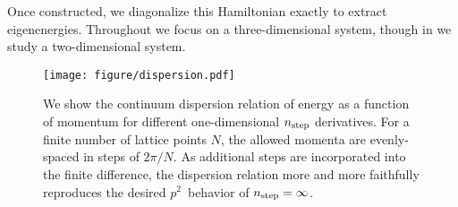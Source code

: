 Once constructed, we diagonalize this Hamiltonian exactly to extract eigenenergies.
Throughout we focus on a three-dimensional system, though in  we study a two-dimensional system.

\begin{figure}
    \texttt{[image: figure/dispersion.pdf]}
    \caption{We show the continuum dispersion relation of energy as a function of momentum for different one-dimensional ${n_\text{step}}$ derivatives.  For a finite number of lattice points $N$, the allowed momenta are evenly-spaced in steps of $2\pi/N$.
    As additional steps are incorporated into the finite difference, the dispersion relation more and more faithfully reproduces the desired $p^2$~behavior of ${n_\text{step}}=\infty$.
    }
    \label{fig:dispersion relation}
\end{figure}
